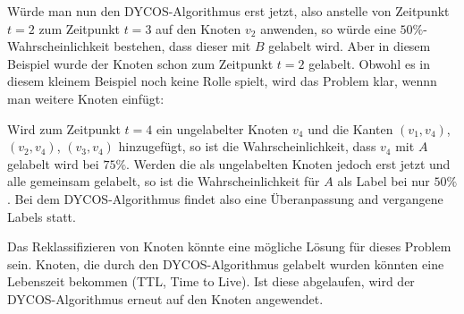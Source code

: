 Würde man nun den DYCOS-Algorithmus erst jetzt, also anstelle von
Zeitpunkt $t=2$ zum Zeitpunkt $t=3$ auf den Knoten $v_2$ anwenden, so
würde eine $50\%$-Wahrscheinlichkeit bestehen, dass dieser mit $B$ 
gelabelt wird. Aber in diesem Beispiel wurde der Knoten schon
zum Zeitpunkt $t=2$ gelabelt. Obwohl es in diesem kleinem Beispiel
noch keine Rolle spielt, wird das Problem klar, wennn man weitere
Knoten einfügt:

Wird zum Zeitpunkt $t=4$ ein ungelabelter Knoten $v_4$ und die Kanten
$(v_1, v_4)$, $(v_2, v_4)$, $(v_3, v_4)$ hinzugefügt, so ist die 
Wahrscheinlichkeit, dass $v_4$ mit $A$ gelabelt wird bei $75\%$.
Werden die als ungelabelten Knoten jedoch erst jetzt und alle gemeinsam
gelabelt, so ist die Wahrscheinlichkeit für $A$ als Label bei nur $50\%$.
Bei dem DYCOS-Algorithmus findet also eine Überanpassung and vergangene
Labels statt.

Das Reklassifizieren von Knoten könnte eine mögliche Lösung für dieses
Problem sein. Knoten, die durch den DYCOS-Algorithmus gelabelt wurden
könnten eine Lebenszeit bekommen (TTL, Time to Live). Ist diese 
abgelaufen, wird der DYCOS-Algorithmus erneut auf den Knoten angewendet.

